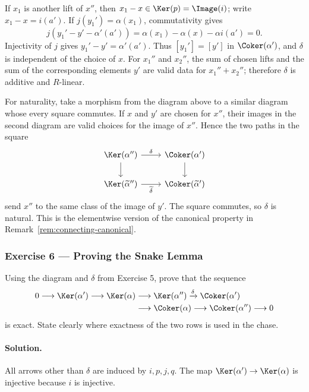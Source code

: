 If $x_1$ is another lift of $x''$, then
$x_1-x\in\Ker(p)=\Image(i)$; write $x_1-x=i(a')$. If
$j(y_1')=\alpha(x_1)$, commutativity gives
\[
	j(y_1'-y'-\alpha'(a'))
	=\alpha(x_1)-\alpha(x)-\alpha i(a')=0.
\]
Injectivity of $j$ gives $y_1'-y'=\alpha'(a')$. Thus
$[y_1']=[y']$ in $\Coker(\alpha')$, and $\delta$ is independent of the
choice of $x$. For $x_1''$ and $x_2''$, the sum of chosen lifts and the sum
of the corresponding elements $y'$ are valid data for $x_1''+x_2''$;
therefore $\delta$ is additive and $R$-linear.

For naturality, take a morphism from the diagram above to a similar diagram
whose every square commutes. If $x$ and $y'$ are chosen for $x''$, their
images in the second diagram are valid choices for the image of $x''$.
Hence the two paths in the square
\[
\begin{tikzcd}
	\Ker(\alpha'') \arrow[r, "\delta"] \arrow[d] & \Coker(\alpha') \arrow[d] \\
	\Ker(\widetilde\alpha'') \arrow[r, "\widetilde\delta"'] & \Coker(\widetilde\alpha')
\end{tikzcd}
\]
send $x''$ to the same class of the image of $y'$. The square commutes, so
$\delta$ is natural. This is the elementwise version of the canonical
property in Remark~\ref{rem:connecting-canonical}.

\subsubsection*{Exercise 6 --- Proving the Snake Lemma}
\hypertarget{o014.mastery.diagram-chasing.001.ex06}{ }
\label{mastery:diagram-chasing-001-ex06}

Using the diagram and $\delta$ from Exercise 5, prove that the sequence
\[
\begin{aligned}
	0 \longrightarrow \Ker(\alpha') \longrightarrow \Ker(\alpha)
	&\longrightarrow \Ker(\alpha'') \xrightarrow{\delta}
	\Coker(\alpha') \\
	&\longrightarrow \Coker(\alpha)
	\longrightarrow \Coker(\alpha'') \longrightarrow 0
\end{aligned}
\]
is exact. State clearly where exactness of the two rows is used in the chase.

\paragraph{Solution.}
\hypertarget{o014.mastery.diagram-chasing.001.sol06}{ }
All arrows other than $\delta$ are induced by $i,p,j,q$. The map
$\Ker(\alpha')\to\Ker(\alpha)$ is injective because $i$ is injective.

